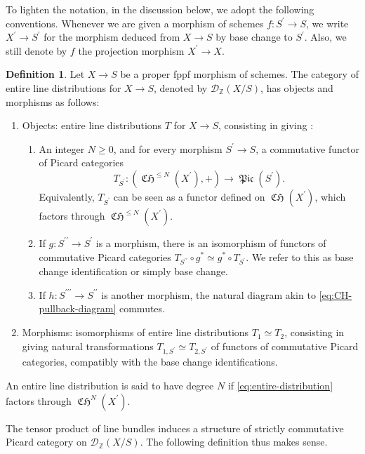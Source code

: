 \documentclass[11pt]{article}
\theoremstyle{plain}
\theoremstyle{definition}
\newtheorem{definition}[theorem]{Definition}
\newcommand{\ZBbb}{\mathbb Z}
\newcommand{\Dcal}{\mathcal D}
\newcommand{\bis}{\prime\prime}
\newcommand{\tris}{\prime\prime\prime}
\DeclareMathOperator{\CHfrak}{\mathfrak{CH}}
\DeclareMathOperator{\Picfr}{\mathfrak{Pic}}
\begin{document}
To lighten the notation, in the discussion below, we adopt the following conventions. Whenever we are given a morphism of schemes $f\colon S^{\prime}\to S$, we write $X^{\prime}\to S^{\prime}$ for the morphism deduced from $X\to S$ by base change to $S^{\prime}$. Also, we still denote by $f$ the projection morphism $X^{\prime}\to X$.
\begin{definition}\label{def:distribution}
Let $X\to S$ be a proper fppf morphism of schemes. The category of entire line distributions for $X\to S$, denoted by $\Dcal_{\ZBbb}(X/S)$, has objects and morphisms as follows:
\begin{enumerate}
\item Objects: entire line distributions $T$ for $X\to S$, consisting in giving :
\begin{enumerate}
\item\label{item:distribution-1} An integer $N\geq 0$, and for every morphism $S^{\prime}\to S$, a commutative functor of Picard categories\vspace*{-3pt}
\begin{equation}\label{eq:entire-distribution}
T_{S^{\prime}}\colon (\CHfrak^{\leq N}(X^{\prime}), +) \to \Picfr(S^{\prime}).
\end{equation}
Equivalently, $T_{S^{\prime}}$ can be seen as a functor defined on $\CHfrak(X^{\prime})$, which factors through $\CHfrak^{\leq N}(X^{\prime})$.

\item\label{item:distribution-2} If $g: S^{\bis} \to S^{\prime}$ is a morphism, there is an isomorphism of functors of commutative Picard categories $T_{S^{\bis}}\circ g^\ast \simeq g^\ast \circ T_{S^\prime}$. We refer to this as base change identification or simply base change.
\item\label{item:distribution-3} If $h: S^{\tris} \to S^{\bis}$ is another morphism, the natural diagram akin to \eqref{eq:CH-pullback-diagram} commutes.
\end{enumerate}
\item Morphisms: isomorphisms of entire line distributions $T_{1}\simeq T_{2}$, consisting in giving natural transformations $T_{1, S^{\prime}}\simeq T_{2, S^{\prime}}$ of functors of commutative Picard categories, compatibly with the base change identifications.
\end{enumerate}
An entire line distribution is said to have degree $N$ if \eqref{eq:entire-distribution} factors through $\CHfrak^{N}(X^{\prime})$.
\end{definition}
The tensor product of line bundles induces a structure of strictly commutative Picard category on $\Dcal_{\ZBbb}(X/S)$. The following definition thus makes sense.
\end{document}
